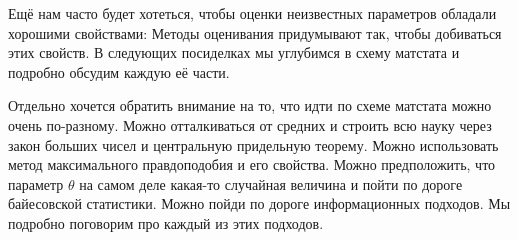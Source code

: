 \documentclass[12pt, a4paper, oneside]{article}
\begin{document}
Ещё нам часто будет хотеться, чтобы оценки неизвестных параметров обладали хорошими свойствами:  Методы оценивания придумывают так, чтобы добиваться этих свойств.  В следующих посиделках мы углубимся в схему матстата и подробно обсудим каждую её части. 

Отдельно хочется обратить внимание на то, что идти по схеме матстата можно очень по-разному. Можно отталкиваться от средних и строить всю науку через закон больших чисел и центральную придельную теорему. Можно использовать метод максимального правдоподобия и его свойства. Можно предположить, что параметр $\theta$ на самом деле какая-то случайная величина и пойти по дороге байесовской статистики. Можно пойди по дороге информационных подходов. Мы подробно поговорим про каждый из этих подходов. 
\end{document}
